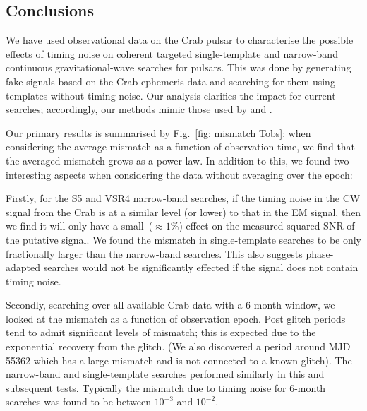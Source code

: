 \documentclass[../full_thesis/full_thesis.tex]{subfiles}
\begin{document}

\subsection{Conclusions}
\label{sec: narrow-band conclusions}
We have used observational data on the Crab pulsar to characterise the possible
effects of timing noise on coherent targeted single-template  and narrow-band
continuous gravitational-wave searches for pulsars.  This was done by generating fake
signals based on the Crab ephemeris data and searching for them using templates
without timing noise. Our analysis clarifies the impact for current searches;
accordingly, our methods mimic those used by \citet{ligo2008} and \citet{LIGO2015}.

Our primary results is summarised by Fig.~\ref{fig: mismatch Tobs}: 
when considering the average mismatch as 
a function of observation time,  we find that the averaged
mismatch grows as a power law. In addition to this, we found two interesting
aspects when considering the data without averaging over the epoch:

Firstly, for the S5 and VSR4 narrow-band searches, if the timing noise in the
CW signal from the Crab is at a similar level (or lower) to that in the EM
signal, then we find it will only have a small~($\approx1\%$) effect on the
measured squared SNR of the putative signal.  We found the mismatch in
single-template searches to be only fractionally larger than the narrow-band
searches.  This also suggests phase-adapted searches would not be significantly
effected if the signal does not contain timing noise.

Secondly, searching over all available Crab data with a 6-month window, we
looked at the mismatch as a function of observation epoch. Post glitch periods
tend to admit significant levels of mismatch; this is expected due to the
exponential recovery from the glitch. (We also discovered a period around MJD
55362 which has a large mismatch and is not connected to a known glitch). The
narrow-band and single-template searches performed similarly in this and
subsequent tests. Typically the mismatch due to timing noise for 6-month
searches was found to be between $10^{-3}$ and $10^{-2}$.
\end{document}
